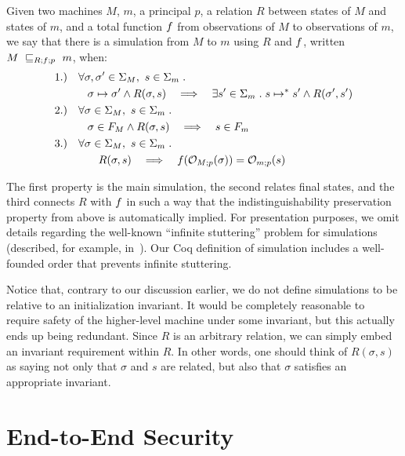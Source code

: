 \begin{definition}[Simulation]
\label{gensimdef}
Given two machines $M$, $m$, a principal $p$, a relation $R$ between
states of $M$ and states of $m$, and a total function $\obsrel{R}$ from
observations of $M$ to observations of $m$, we say that there is a
simulation from $M$ to $m$ using $R$ and $\obsrel{R}$,
written $\simu{M}{m}{R;\obsrel{R};p}$, when:
{\small
\begin{align*}
& 1.) \quad \forall \sigma, \sigma' \in \Sigma_M, \,\, s \in \Sigma_m \such \\
& \qquad \quad \sigma \steprel \sigma' \land R(\sigma,s) 
\quad \Longrightarrow \quad
\exists s' \in \Sigma_m \such s \steprel^* s' \land R(\sigma',s') \\
& 2.) \quad \forall \sigma \in \Sigma_M, \,\, s \in \Sigma_m \such \\
& \qquad \quad \sigma \in F_M \land R(\sigma,s) \quad \Longrightarrow \quad s \in F_m \\
& 3.) \quad \forall \sigma \in \Sigma_M, \,\, s \in \Sigma_m \such \\
& \qquad \qquad R(\sigma,s) \quad \Longrightarrow \quad 
\obsrel{R}(\observem{M}{p}{\sigma}) = \observem{m}{p}{s}
\end{align*}}
\end{definition}

\noindent
The first property is the main simulation, the second relates final
states, and the third connects $R$ with $\obsrel{R}$ in such a way
that the indistinguishability preservation property from above is
automatically implied.
For presentation purposes, we omit details 
regarding the well-known ``infinite stuttering'' problem 
for simulations
(described, for example, in~\cite{Leroy-backend}). Our Coq
definition of simulation includes a well-founded order that
prevents infinite stuttering.

Notice that, contrary to our discussion earlier, we do not 
define simulations to be relative to an initialization invariant. It would be
completely reasonable to require safety of the higher-level machine
under some invariant, but this actually ends up being redundant.
Since $R$ is an arbitrary relation, we can simply embed an
invariant requirement within $R$. In other words, one should think 
of $R(\sigma,s)$ as saying not only that $\sigma$ and $s$ are related, 
but also that $\sigma$ satisfies an appropriate invariant.

\section{End-to-End Security}

